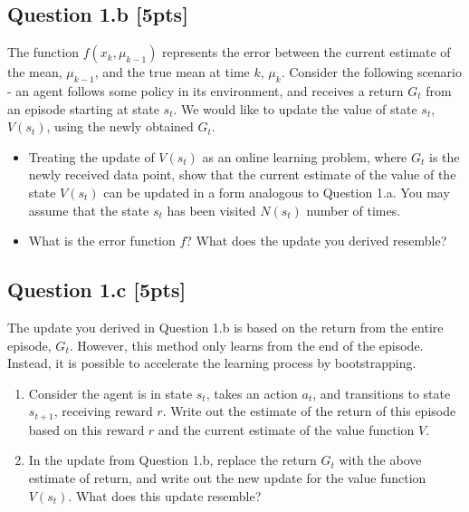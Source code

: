 \documentclass[12pt]{article}
\begin{document}
\noindent
\begin{solution}
\end{solution}

\subsection*{Question 1.b \textbf{[5pts]}}
The function $f(x_k, \mu_{k-1})$ represents the error between the current estimate of the mean, $\mu_{k-1}$, and the true mean at time $k$, $\mu_k$. Consider the following scenario - an agent follows some policy in its environment, and receives a return $G_t$ from an episode starting at state $s_t$. We would like to update the value of state $s_t$, $V(s_t)$, using the newly obtained $G_t$. 

\begin{itemize}
    \item Treating the update of $V(s_t)$ as an online learning problem, where $G_t$ is the newly received data point, show that the current estimate of the value of the state $V(s_t)$ can be updated in a form analogous to Question 1.a. You may assume that the state $s_t$ has been visited $N(s_t)$ number of times.
    
    \item What is the error function $f$? What does the update you derived resemble?  
\end{itemize}

\noindent
\begin{solution}
\end{solution}

\subsection*{Question 1.c \textbf{[5pts]}}
The update you derived in Question 1.b is based on the return from the entire episode, $G_t$. However, this method only learns from the end of the episode. Instead, it is possible to accelerate the learning process by bootstrapping. 

\begin{enumerate}
    \item Consider the agent is in state $s_t$, takes an action $a_t$, and transitions to state $s_{t+1}$, receiving reward $r$. Write out the estimate of the return of this episode based on this reward $r$ and the current estimate of the value function $V$. 
    \item In the update from Question 1.b, replace the return $G_t$ with the above estimate of return, and write out the new update for the value function $V(s_t)$. What does this update resemble?
\end{enumerate}
\end{document}
